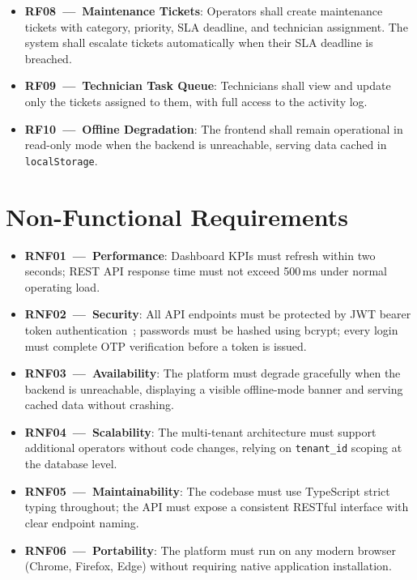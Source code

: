 \documentclass[12pt,a4paper]{report}
\begin{document}
\begin{itemize}
        performance analytics.
  \item \textbf{RF08~---~Maintenance Tickets}: Operators shall create maintenance tickets with
        category, priority, SLA deadline, and technician assignment. The system shall escalate
        tickets automatically when their SLA deadline is breached.
  \item \textbf{RF09~---~Technician Task Queue}: Technicians shall view and update only the
        tickets assigned to them, with full access to the activity log.
  \item \textbf{RF10~---~Offline Degradation}: The frontend shall remain operational in
        read-only mode when the backend is unreachable, serving data cached in
        \texttt{localStorage}.
\end{itemize}

\section{Non-Functional Requirements}

\begin{itemize}
  \item \textbf{RNF01~---~Performance}: Dashboard KPIs must refresh within two seconds; REST
        API response time must not exceed 500\,ms under normal operating load.
  \item \textbf{RNF02~---~Security}: All API endpoints must be protected by JWT bearer token
        authentication~\autocite{rfc7519}; passwords must be hashed using bcrypt; every login must
        complete OTP verification before a token is issued.
  \item \textbf{RNF03~---~Availability}: The platform must degrade gracefully when the backend
        is unreachable, displaying a visible offline-mode banner and serving cached data without
        crashing.
  \item \textbf{RNF04~---~Scalability}: The multi-tenant architecture must support additional
        operators without code changes, relying on \texttt{tenant\_id} scoping at the database
        level.
  \item \textbf{RNF05~---~Maintainability}: The codebase must use TypeScript strict typing
        throughout; the API must expose a consistent RESTful interface with clear endpoint naming.
  \item \textbf{RNF06~---~Portability}: The platform must run on any modern browser (Chrome,
        Firefox, Edge) without requiring native application installation.
\end{itemize}
\end{document}
